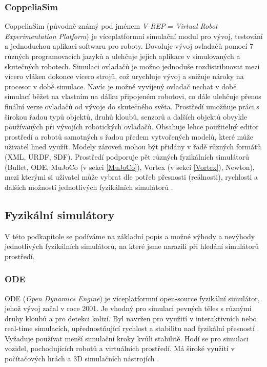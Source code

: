 \subsubsection{CoppeliaSim} \label{CoppeliaSim}
CoppeliaSim \citep{coppeliaSim} (původně známý pod jménem \emph{V-REP} =
\emph{Virtual Robot Experimentation Platform}) je víceplatformní simulační
modul pro vývoj, testování a jednoduchou aplikaci softwaru pro roboty. Dovoluje
vývoj ovladačů pomocí 7 různých programovacích jazyků a ulehčuje jejich
aplikace v simulovaných a skutečných robotech. Simulaci ovladačů je možno
jednoduše rozdistribuovat mezi vícero vláken dokonce vícero strojů, což
urychluje vývoj a snižuje nároky na procesor v době simulace. Navíc je možné
vyvíjený ovladač nechat v době simulací běžet na vlastním na dálku připojeném
robotovi, co dále ulehčuje přenos finální verze ovladačů od vývoje do
skutečného světa. Prostředí umožňuje práci s širokou řadou typů objektů, druhů
kloubů, senzorů a dalších objektů obvykle používaných při vývojích robotických
ovladačů. Obsahuje lehce použitelný editor prostředí a robotů samotných s řadou
předem vytvořených modelů, které může uživatel hned využít. Modely zároveň
mohou být přidány v řadě různých formátů (XML, URDF, SDF). Prostředí
podporuje pět různých fyzikálních simulátorů (Bullet, ODE, MuJoCo (v sekci
\ref{MuJoCo}), Vortex (v sekci \ref{Vortex}), Newton), mezi kterými si uživatel
může vybrat dle potřeb přesnosti (reálnosti), rychlosti a dalších možností
jednotlivých fyzikálních simulátorů \citep{nogueira2014comparative}.

\subsection{Fyzikální simulátory} \label{Simulované prostředí - f simulátory}

V této podkapitole se podíváme na základní popis a možné výhody a nevýhody
jednotlivých fyzikálních simulátorů, na které jsme narazili při hledání
simulátorů prostředí.

\subsubsection{ODE} \label{ODE}
ODE (\emph{Open Dynamics Engine}) \citep{opendynamicsengine} je víceplatformní
open-source fyzikální simulátor, jehož vývoj začal v roce 2001. Je vhodný pro
simulaci pevných těles s různými druhy kloubů a pro detekci kolizí. Byl navržen
pro využití v interaktivních nebo real-time simulacích, upřednostňující
rychlost a stabilitu nad fyzikální přesností \citep{smith2007open}. Vyžaduje
používat menší simulační kroky kvůli stabilitě. Hodí se pro simulaci vozidel,
pochodujících robotů a virtuálních prostředí. Má široké využití v počítačových
hrách a 3D simulačních nástrojích \citet{coppeliarobotics}.

